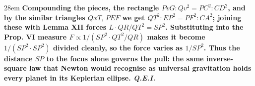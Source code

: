 \documentclass[border=4pt]{standalone}
\begin{document}
\begin{varwidth}{28em}
\large\bfseries
Compounding the pieces, the rectangle $PvG : Qv^2 = PC^2 : CD^2$, and by the      similar triangles $QxT,\,PEF$ we get $QT^2 : EP^2 = PF^2 : CA^2$; joining these      with Lemma XII forces $L\cdot QR / QT^2 = SP^2$. Substituting into      the Prop. VI measure $F \propto 1/(SP^2 \cdot QT^2/QR)$ makes it become      $1/(SP^2\cdot SP^2)$ divided cleanly, so the force varies as      $1/SP^2$. Thus the distance $SP$ to the focus alone governs the pull:      the same inverse-square law that Newton would recognise as universal      gravitation holds every planet in its Keplerian ellipse. \textit{Q.E.I.}
\end{varwidth}
\end{document}
